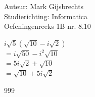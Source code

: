 \documentclass[a4paper]{article}
\begin{document}
\noindent \large Auteur: Mark Gijsbrechts \\
\noindent \large Studierichting: Informatica\\
\noindent \large Oefeningenreeks 1B nr. 8.10\\

\medskip

\normalsize

$i\sqrt{5} \left(\sqrt{10} - i\sqrt{2}\right)$ \\

$= i\sqrt{50} - i^2 \sqrt{10}$ \\

$= 5i\sqrt{2} + \sqrt{10}$ \\

$= \sqrt{10} + 5i\sqrt{2}$



\begin{thebibliography}{999}
\end{thebibliography}
\end{document}

